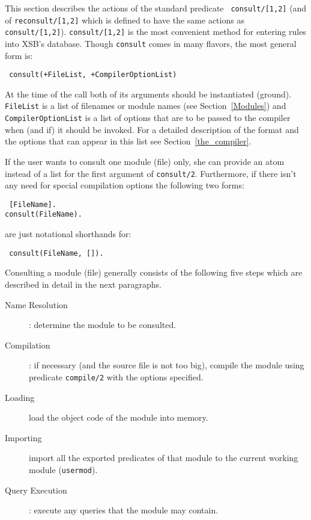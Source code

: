 This section describes the actions of the standard predicate {\tt
consult/[1,2]} (and of {\tt reconsult/[1,2]} which is defined to have
the same actions as {\tt consult/[1,2]}).  {\tt consult/[1,2]} is the
most convenient method for entering rules into XSB's database.  Though
{\tt consult} comes in many flavors, the most general form is:
\begin{center}{\tt
	consult(+FileList, +CompilerOptionList) }
\end{center} 
At the time of the call both of its arguments should be instantiated
(ground).  {\tt FileList} is a list of filenames or module names (see
Section~\ref{Modules}) and {\tt CompilerOptionList} is a list of
options that are to be passed to the compiler when (and if) it should
be invoked.  For a detailed description of the format and the options
that can appear in this list see Section~\ref{the_compiler}.

If the user wants to consult one module (file) only, she can provide an
atom instead of a list for the first argument of {\tt consult/2}.
Furthermore, if there isn't any need for special compilation options the
following two forms:
\begin{center}{\tt
	    [FileName]. \\
	consult(FileName).
}\end{center}
are just notational shorthands for:
\begin{center}{\tt
	consult(FileName, []).
}\end{center}

Consulting a module (file) generally consists of the following five
steps which are described in detail in the next paragraphs.
\begin{description}
\item[Name Resolution]: determine the module to be consulted.
\item[Compilation]:  if necessary (and the source file is not too big),
      compile the module using predicate {\tt compile/2} with the options
      specified.
\item[Loading] load the object code of the module into memory.
\item[Importing] import all the exported predicates of that module to
      the current working module ({\tt usermod}).
\item[Query Execution]: execute any queries that the module may contain.
\end{description}


